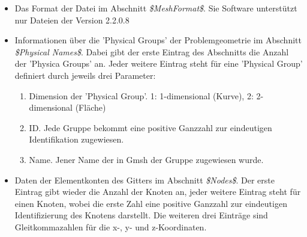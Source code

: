 \begin{itemize}
	\item Das Format der Datei im Abschnitt \textit{\$MeshFormat\$}. Sie Software unterstützt nur Dateien der Version 2.2.0.8
	
	\item Informationen über die 'Physical Groups' der Problemgeometrie im Abschnitt \textit{\$Physical Names\$}. Dabei gibt der erste Eintrag des Abschnitts die Anzahl der 'Physica Groups' an. Jeder weitere Eintrag steht für eine 'Physical Group' definiert durch jeweils drei Parameter:
	\begin{enumerate}
		\item Dimension der 'Physical Group'. 1: 1-dimensional (Kurve), 2: 2-dimensional (Fläche)
		\item ID. Jede Gruppe bekommt eine positive Ganzzahl zur eindeutigen Identifikation zugewiesen.
		\item Name. Jener Name der in Gmsh der Gruppe zugewiesen wurde.
	\end{enumerate}

	\item Daten der Elementkonten des Gitters im Abschnitt \textit{\$Nodes\$}. Der erste Eintrag gibt wieder die Anzahl der Knoten an, jeder weitere Eintrag steht für einen Knoten, wobei die erste Zahl eine positive Ganzzahl zur eindeutigen Identifizierung des Knotens darstellt. Die weiteren drei Einträge sind Gleitkommazahlen für die x-, y- und z-Koordinaten.
	

\end{itemize}
